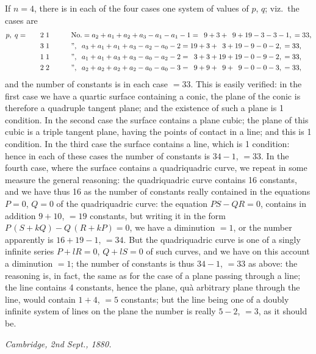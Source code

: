 \documentclass[11pt,a4paper]{book}
\begin{document}
If $n=4$, there is in each of the four cases one system of values of $p$, $q$; viz.\ the cases are
\begin{alignat*}{3}
&p,\; q = &&\quad 2\; 1 \qquad
&&\mathrm{No.}=a_2+a_1+a_2+a_3-a_1-a_1-1=\phantom{1}9+3+\phantom{1}9+19-3-3-1,\;=33,\\
&          &&\quad 3\; 1 \qquad
&&     ",\;\; a_3+a_1+a_1+a_3-a_2-a_0-2=19+3+\phantom{1}3+19-9-0-2,\;=33,\\
&          &&\quad 1\; 1 \qquad
&&     ",\;\; a_1+a_1+a_3+a_3-a_0-a_2-2=\phantom{1}3+3+19+19-0-9-2,\;=33,\\
&          &&\quad 2\; 2 \qquad
&&     ",\;\; a_2+a_2+a_2+a_2-a_0-a_0-3=\phantom{1}9+9+\phantom{1}9+\phantom{1}9-0-0-3,\;=33,
\end{alignat*}
and the number of constants is in each case $=33$. This is easily verified: in the first case we have a quartic surface containing a conic, the plane of the conic is therefore a quadruple tangent plane; and the existence of such a plane is 1 condition. In the second case the surface contains a plane cubic; the plane of this cubic is a triple tangent plane, having the points of contact in a line; and this is 1 condition. In the third case the surface contains a line, which is 1 condition: hence in each of these cases the number of constants is $34-1$, $=33$. In the fourth case, where the surface contains a quadriquadric curve, we repeat in some measure the general reasoning: the quadriquadric curve contains 16 constants, and we have thus 16 as the number of constants really contained in the equations $P=0$, $Q=0$ of the quadriquadric curve: the equation $PS-QR=0$, contains in addition $9+10$, $=19$ constants, but writing it in the form $P\,(S+kQ)-Q\,(R+kP)=0$, we have a diminution $=1$, or the number apparently is $16+19-1$, $=34$. But the quadriquadric curve is one of a singly infinite series $P+lR=0$, $Q+lS=0$ of such curves, and we have on this account a diminution $=1$; the number of constants is thus $34-1$, $=33$ as above: the reasoning is, in fact, the same as for the case of a plane passing through a line; the line contains 4 constants, hence the plane, qu\`a arbitrary plane through the line, would contain $1+4$, $=5$ constants; but the line being one of a doubly infinite system of lines on the plane the number is really $5-2$, $=3$, as it should be.

\begin{flushright}
\textit{Cambridge, 2nd Sept., 1880.}
\end{flushright}
\end{document}
